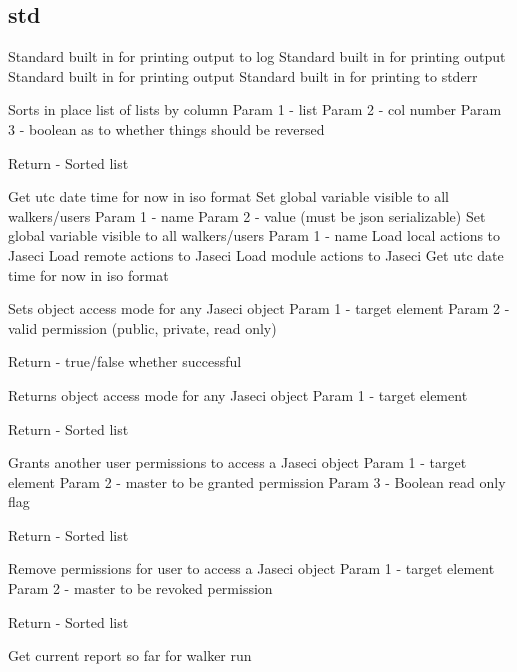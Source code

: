 \subsection{std}
{Standard built in for printing output to log}
{Standard built in for printing output}
{Standard built in for printing output}
{Standard built in for printing to stderr}
{Sorts in place list of lists by column
Param 1 - list
Param 2 - col number
Param 3 - boolean as to whether things should be reversed

Return - Sorted list}
{Get utc date time for now in iso format}
{Set global variable visible to all walkers/users
Param 1 - name
Param 2 - value (must be json serializable)}
{Set global variable visible to all walkers/users
Param 1 - name}
{Load local actions to Jaseci}
{Load remote actions to Jaseci}
{Load module actions to Jaseci}
{Get utc date time for now in iso format}
{Sets object access mode for any Jaseci object
Param 1 - target element
Param 2 - valid permission (public, private, read only)

Return - true/false whether successful}
{Returns object access mode for any Jaseci object
Param 1 - target element

Return - Sorted list}
{Grants another user permissions to access a Jaseci object
Param 1 - target element
Param 2 - master to be granted permission
Param 3 - Boolean read only flag

Return - Sorted list}
{Remove permissions for user to access a Jaseci object
Param 1 - target element
Param 2 - master to be revoked permission

Return - Sorted list}
{Get current report so far for walker run}
